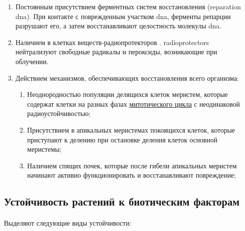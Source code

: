 \begin{enumerate}

	\item Постоянным присутствием ферментных систем восстановления (\gls{reparation} \gls{dna}). При контакте с поврежденным участком \gls{dna}, ферменты репарции разрушают его, а затем восстанавливают целостность молекулы \gls{dna}. 
	\item Наличием в клетках веществ-радиопротекторов . \gls{radioprotectors} нейтрализуют свободные радикалы и пероксиды, возникающие при облучении.
	\item Действием механизмов, обеспечивающих восстановления всего организма: 

	\begin{enumerate}
		\item Неоднородностью популяции делящихся клеток меристем, которые содержат клетки на разных фазах \hyperlink{cellCycle}{митотического цикла} с неодинаковой радиоустойчивостью;
		\item Присутствием в апикальных меристемах покоящихся клеток, которые приступают к делению при остановке деления клеток основной меристемы;
		\item Наличием спящих почек, которые после гибели апикальных меристем начинают активно функционировать и восстанавливают повреждение;

	\end{enumerate}

\end{enumerate}

\subsection*{Устойчивость растений к биотическим факторам}

\paragraph*{} 

\paragraph*{}Выделяют следующие виды устойчивости:

